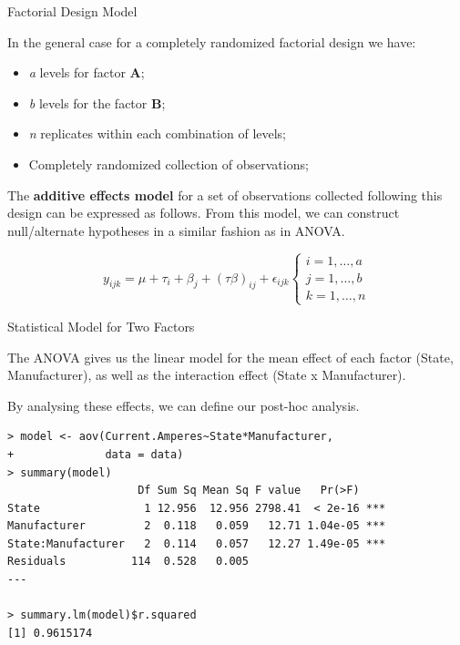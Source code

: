 \begin{frame}{Factorial Design Model}

  In the general case for a completely randomized factorial design we have:

\begin{itemize}
  \item \textit{a} levels for factor \textbf{A};
  \item \textit{b} levels for the factor \textbf{B};
  \item \textit{n} replicates within each combination of levels;
  \item Completely randomized collection of observations;
\end{itemize}\bigskip

  The {\bf additive effects model} for a set of observations collected following this design can be expressed as follows. From this model, we can construct null/alternate hypotheses in a similar fashion as in ANOVA.

  \begin{equation*}
  y_{ijk} = \mu+\tau_i+\beta_j+(\tau\beta)_{ij}+\epsilon_{ijk}\begin{cases}
  i=1,\ldots,a\\
  j=1,\ldots,b\\
  k=1,\ldots,n
\end{cases}\end{equation*}
\end{frame}

\begin{frame}[fragile]{Statistical Model for Two Factors}

The ANOVA gives us the linear model for the mean effect of each
factor (State, Manufacturer), as well as the interaction effect (State x Manufacturer).
\medskip

By analysing these effects, we can define our post-hoc analysis.

{\smaller
\begin{verbatim}
> model <- aov(Current.Amperes~State*Manufacturer,
+              data = data)
> summary(model)
                    Df Sum Sq Mean Sq F value   Pr(>F)
State                1 12.956  12.956 2798.41  < 2e-16 ***
Manufacturer         2  0.118   0.059   12.71 1.04e-05 ***
State:Manufacturer   2  0.114   0.057   12.27 1.49e-05 ***
Residuals          114  0.528   0.005
---

> summary.lm(model)$r.squared
[1] 0.9615174
\end{verbatim}}
\end{frame}

